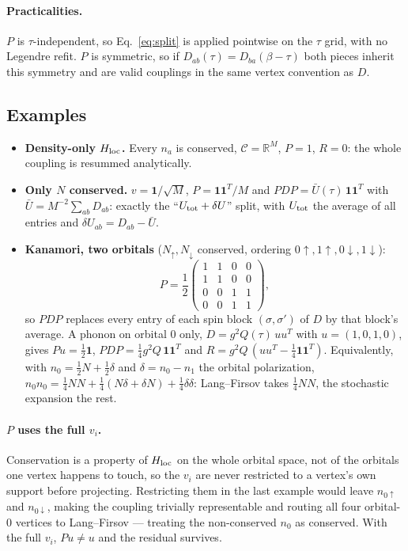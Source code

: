 \documentclass[a4paper,12pt]{article}
\renewcommand{\t}{\ensuremath{\tau}}
\newcommand{\Hloc}{\ensuremath{H_{\rm loc}}}
\begin{document}
\paragraph{Practicalities.} $P$ is $\t$-independent, so Eq.~\eqref{eq:split} is applied
pointwise on the $\t$ grid, with no Legendre refit. $P$ is symmetric, so if
$D_{ab}(\t)=D_{ba}(\beta-\t)$ both pieces inherit this symmetry and are valid couplings
in the same vertex convention as $D$.

\subsection{Examples}

\begin{itemize}
  \item \textbf{Density-only $\Hloc$.} Every $n_a$ is conserved, $\mathcal C=\mathbb R^M$,
    $P=1$, $R=0$: the whole coupling is resummed analytically.
  \item \textbf{Only $N$ conserved.} $v=\mathbf 1/\sqrt M$, $P=\mathbf 1\mathbf 1^T/M$ and
    $PDP=\bar U(\t)\,\mathbf 1\mathbf 1^T$ with $\bar U=M^{-2}\sum_{ab}D_{ab}$: exactly the
    ``$U_{\rm tot}+\delta U$'' split, with $U_{\rm tot}$ the average of all entries and
    $\delta U_{ab}=D_{ab}-\bar U$.
  \item \textbf{Kanamori, two orbitals} ($N_\uparrow,N_\downarrow$ conserved, ordering
    $0\!\uparrow,1\!\uparrow,0\!\downarrow,1\!\downarrow$):
    \[
      P=\frac12\begin{pmatrix}1&1&0&0\\1&1&0&0\\0&0&1&1\\0&0&1&1\end{pmatrix},
    \]
    so $PDP$ replaces every entry of each spin block $(\sigma,\sigma')$ of $D$ by that
    block's average. A phonon on orbital 0 only, $D=g^2Q(\t)\,uu^T$ with $u=(1,0,1,0)$,
    gives $Pu=\tfrac12\mathbf 1$, $PDP=\tfrac14g^2Q\,\mathbf 1\mathbf 1^T$ and
    $R=g^2Q\,(uu^T-\tfrac14\mathbf 1\mathbf 1^T)$. Equivalently, with
    $n_0=\tfrac12N+\tfrac12\delta$ and $\delta=n_0-n_1$ the orbital polarization,
    $n_0n_0=\tfrac14NN+\tfrac14(N\delta+\delta N)+\tfrac14\delta\delta$: Lang--Firsov takes
    $\tfrac14NN$, the stochastic expansion the rest.
\end{itemize}

\paragraph{$P$ uses the full $v_i$.} Conservation is a property of $\Hloc$ on the whole
orbital space, not of the orbitals one vertex happens to touch, so the $v_i$ are never
restricted to a vertex's own support before projecting. Restricting them in the last
example would leave $n_{0\uparrow}$ and $n_{0\downarrow}$, making the coupling trivially
representable and routing all four orbital-0 vertices to Lang--Firsov --- treating the
non-conserved $n_0$ as conserved. With the full $v_i$, $Pu\neq u$ and the residual
survives.
\end{document}
